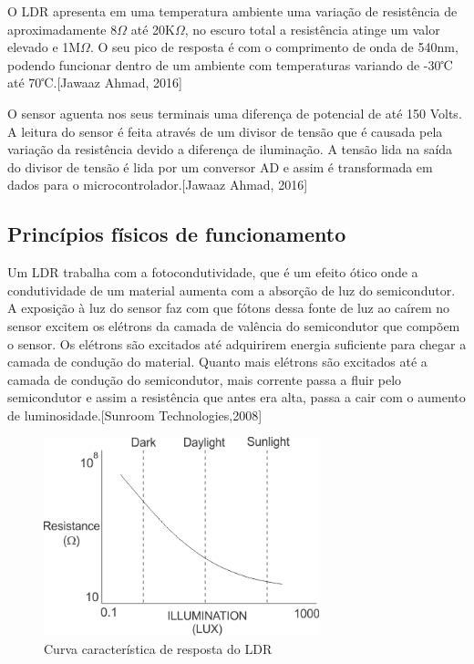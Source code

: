 O LDR apresenta em uma temperatura ambiente uma variação de resistência de aproximadamente 8$\Omega$ até 20K$\Omega$, no escuro total a resistência atinge um valor elevado e 1M$\Omega$. O seu pico de resposta é com o comprimento de onda de 540nm, podendo funcionar dentro de um ambiente com temperaturas variando de -30℃ até 70℃\cite{ahmad2016}.[Jawaaz Ahmad, 2016]

O sensor aguenta nos seus terminais uma diferença de potencial de até 150 Volts. A leitura do sensor é feita através de um divisor de tensão que é causada pela variação da resistência devido a diferença de iluminação. A tensão lida na saída do divisor de tensão é lida por um conversor AD e assim é transformada em dados para o microcontrolador\cite{ahmad2016}.[Jawaaz Ahmad, 2016]

\subsection{Princípios físicos de funcionamento}

Um LDR trabalha com a fotocondutividade, que é um efeito ótico onde a condutividade de um material aumenta com a absorção de luz do semicondutor. A exposição à luz do sensor faz com que fótons dessa fonte de luz ao caírem no sensor excitem os elétrons da camada de valência do semicondutor que compõem o sensor. Os elétrons são excitados até adquirirem energia suficiente para chegar a camada de condução do material. Quanto mais elétrons são excitados até a camada de condução do semicondutor, mais corrente passa a fluir pelo semicondutor e assim a resistência que antes era alta, passa a cair com o aumento de luminosidade\cite{sunroom2008}.[Sunroom Technologies,2008]

\begin{figure}[H]
	\centering
	\includegraphics[width=8cm]{figuras/curva_ldr.png}
	\caption{Curva característica de resposta do LDR} \label{curva_ldr}
\end{figure}


